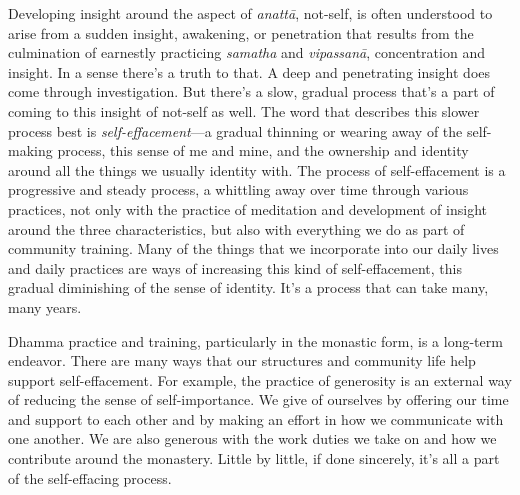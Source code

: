 Developing insight around the aspect of \emph{anattā}, not-self, is 
often understood to arise from a sudden insight, awakening, or 
penetration that results from the culmination of earnestly practicing 
\emph{samatha} and \emph{vipassanā}, concentration and insight. In a 
sense there's a truth to that. A deep and penetrating insight does come 
through investigation. But there's a slow, gradual process that's a 
part of coming to this insight of not-self as well. The word that 
describes this slower process best is \emph{self-effacement}---a 
gradual thinning or wearing away of the self-making process, this sense 
of me and mine, and the ownership and identity around all the things we 
usually identity with. The process of self-effacement is a progressive 
and steady process, a whittling away over time through various 
practices, not only with the practice of meditation and development of 
insight around the three characteristics, but also with everything we 
do as part of community training. Many of the things that we 
incorporate into our daily lives and daily practices are ways of 
increasing this kind of self-effacement, this gradual diminishing of 
the sense of identity. It's a process that can take many, many years.

Dhamma practice and training, particularly in the monastic form, is a 
long-term endeavor. There are many ways that our structures and 
community life help support self-effacement. For example, the practice 
of generosity is an external way of reducing the sense of 
self-importance. We give of ourselves by offering our time and support 
to each other and by making an effort in how we communicate with one 
another. We are also generous with the work duties we take on and how 
we contribute around the monastery. Little by little, if done 
sincerely, it's all a part of the self-effacing process.

